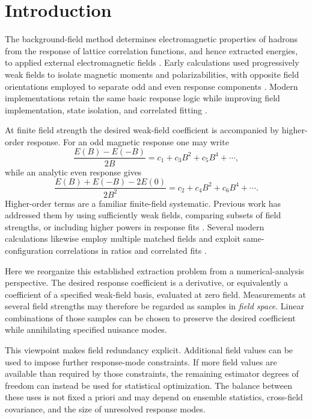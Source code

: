 \documentclass[aps,prd,preprint,nofootinbib,floatfix]{revtex4-2}
\begin{document}
\section{Introduction}

The background-field method determines electromagnetic properties of hadrons from the response of lattice correlation functions, and hence extracted energies, to applied external electromagnetic fields \cite{Martinelli1982,Bernard1982}. Early calculations used progressively weak fields to isolate magnetic moments and polarizabilities, with opposite field orientations employed to separate odd and even response components \cite{Lee2005MagPol,Lee2005BaryonMom,Lee2008MagMom,Alexandru2009BFM}. Modern implementations retain the same basic response logic while improving field implementation, state isolation, and correlated fitting \cite{Detmold2010Electric,Detmold2011Review,Davoudi2015Background,Bignell2020Pion,Kabelitz2024Octet}.

At finite field strength the desired weak-field coefficient is accompanied by higher-order response. For an odd magnetic response one may write
\begin{equation}
\frac{E(B)-E(-B)}{2B}=c_1+c_3B^2+c_5B^4+\cdots,
\label{eq:oddreduced}
\end{equation}
while an analytic even response gives
\begin{equation}
\frac{E(B)+E(-B)-2E(0)}{2B^2}=c_2+c_4B^2+c_6B^4+\cdots.
\label{eq:evenreduced}
\end{equation}
Higher-order terms are a familiar finite-field systematic. Previous work has addressed them by using sufficiently weak fields, comparing subsets of field strengths, or including higher powers in response fits \cite{Lee2005MagPol}. Several modern calculations likewise employ multiple matched fields and exploit same-configuration correlations in ratios and correlated fits \cite{Primer2014,Bignell2017Nucleon,Bignell2020Pion,Kabelitz2024Octet}.

Here we reorganize this established extraction problem from a numerical-analysis perspective. The desired response coefficient is a derivative, or equivalently a coefficient of a specified weak-field basis, evaluated at zero field. Measurements at several field strengths may therefore be regarded as samples in \emph{field space}. Linear combinations of those samples can be chosen to preserve the desired coefficient while annihilating specified nuisance modes.

This viewpoint makes field redundancy explicit. Additional field values can be used to impose further response-mode constraints. If more field values are available than required by those constraints, the remaining estimator degrees of freedom can instead be used for statistical optimization. The balance between these uses is not fixed a priori and may depend on ensemble statistics, cross-field covariance, and the size of unresolved response modes.
\end{document}
